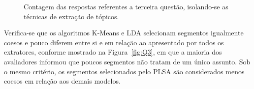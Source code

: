 \begin{figure}[!h] \centering     %


	\caption{Contagem das respostas referentes a terceira questão, isolando-se as técnicas de extração de tópicos.}
	\label{fig:influenciaExtSegQ3}
\end{figure}

Verifica-se que os algoritmos K-Means e LDA selecionam segmentos igualmente coesos e pouco diferem entre si e em relação ao apresentado por todos os extratores, conforme mostrado na Figura~\ref{fig:Q3}, em que a maioria dos avaliadores informou que poucos segmentos não tratam de um único assunto. 
Sob o mesmo critério, os segmentos selecionados pelo PLSA são considerados menos coesos em relação aos demais modelos. 






